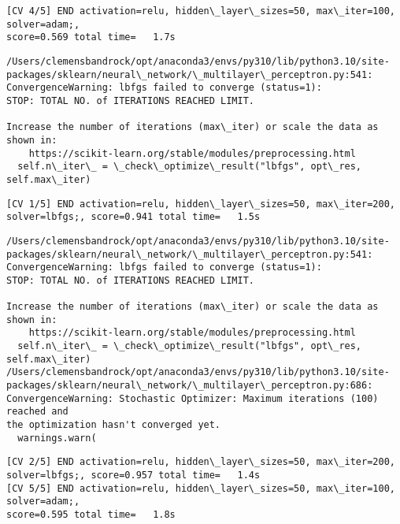\documentclass[11pt]{article}
\begin{document}
    \begin{Verbatim}[commandchars=\\\{\}]
[CV 4/5] END activation=relu, hidden\_layer\_sizes=50, max\_iter=100, solver=adam;,
score=0.569 total time=   1.7s
    \end{Verbatim}

    \begin{Verbatim}[commandchars=\\\{\}]
/Users/clemensbandrock/opt/anaconda3/envs/py310/lib/python3.10/site-
packages/sklearn/neural\_network/\_multilayer\_perceptron.py:541:
ConvergenceWarning: lbfgs failed to converge (status=1):
STOP: TOTAL NO. of ITERATIONS REACHED LIMIT.

Increase the number of iterations (max\_iter) or scale the data as shown in:
    https://scikit-learn.org/stable/modules/preprocessing.html
  self.n\_iter\_ = \_check\_optimize\_result("lbfgs", opt\_res, self.max\_iter)
    \end{Verbatim}

    \begin{Verbatim}[commandchars=\\\{\}]
[CV 1/5] END activation=relu, hidden\_layer\_sizes=50, max\_iter=200,
solver=lbfgs;, score=0.941 total time=   1.5s
    \end{Verbatim}

    \begin{Verbatim}[commandchars=\\\{\}]
/Users/clemensbandrock/opt/anaconda3/envs/py310/lib/python3.10/site-
packages/sklearn/neural\_network/\_multilayer\_perceptron.py:541:
ConvergenceWarning: lbfgs failed to converge (status=1):
STOP: TOTAL NO. of ITERATIONS REACHED LIMIT.

Increase the number of iterations (max\_iter) or scale the data as shown in:
    https://scikit-learn.org/stable/modules/preprocessing.html
  self.n\_iter\_ = \_check\_optimize\_result("lbfgs", opt\_res, self.max\_iter)
/Users/clemensbandrock/opt/anaconda3/envs/py310/lib/python3.10/site-
packages/sklearn/neural\_network/\_multilayer\_perceptron.py:686:
ConvergenceWarning: Stochastic Optimizer: Maximum iterations (100) reached and
the optimization hasn't converged yet.
  warnings.warn(
    \end{Verbatim}

    \begin{Verbatim}[commandchars=\\\{\}]
[CV 2/5] END activation=relu, hidden\_layer\_sizes=50, max\_iter=200,
solver=lbfgs;, score=0.957 total time=   1.4s
[CV 5/5] END activation=relu, hidden\_layer\_sizes=50, max\_iter=100, solver=adam;,
score=0.595 total time=   1.8s
    \end{Verbatim}
\end{document}
